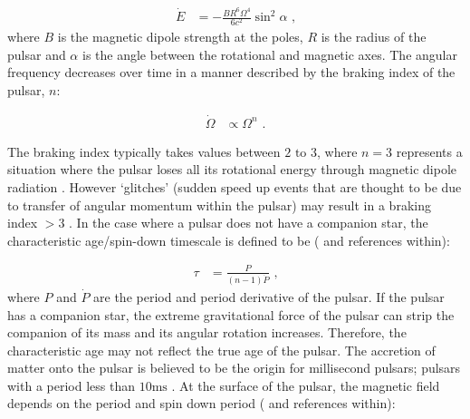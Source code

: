 \begin{equation}
    \begin{aligned}
    \dot{E}&=-\frac{BR^6\Omega^4}{6c^2}\sin^2\alpha\text{ ,}
    \end{aligned}
\end{equation}
where $B$ is the magnetic dipole strength at the poles, $R$ is the radius of the pulsar and $\alpha$ is the angle between the rotational and magnetic axes. The angular frequency decreases over time in a manner described by the braking index of the pulsar, $n$:

\begin{equation}
    \begin{aligned}
    \dot{\Omega} &\propto \Omega^n\text{ .}
    \end{aligned}
\end{equation}

The braking index typically takes values between $2\text{ to }3$, where $n=3$ represents a situation where the pulsar loses all its rotational energy through magnetic dipole radiation \citep{2007Ap&SS.308..317L}. However `glitches' (sudden speed up events that are thought to be due to transfer of angular momentum within the pulsar) may result in a braking index $>3$ \citep{2019MNRAS.489.3810P,2020MNRAS.494.2012P}. In the case where a pulsar does not have a companion star, the characteristic age/spin-down timescale is defined to be (\cite{2007ASSL..326.....H} and references within):

\begin{equation}
    \begin{aligned}
    \tau&=\frac{P}{(n-1)\dot{P}} \text{ ,}
    \end{aligned} \label{eq:chapter1_characteristic_age}
\end{equation}
\noindent where $P$ and $\dot{P}$ are the period and period derivative of the pulsar. If the pulsar has a companion star, the extreme gravitational force of the pulsar can strip the companion of its mass and its angular rotation increases. Therefore, the characteristic age may not reflect the true age of the pulsar. The accretion of matter onto the pulsar is believed to be the origin for millisecond pulsars; pulsars with a period less than $10\si{\milli\second}$ \citep{1982Natur.300..728A}.
\newpar
At the surface of the pulsar, the magnetic field depends on the period and spin down period (\cite{2012hpa..book.....L} and references within):

